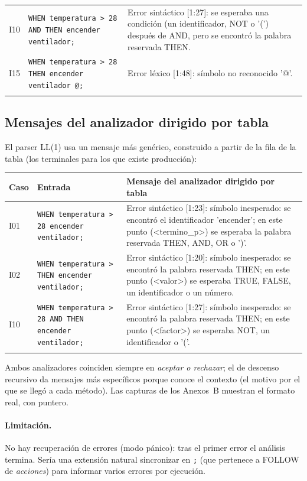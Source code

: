 \begin{longtable}{@{}l >{\raggedright\arraybackslash}p{5.2cm} >{\raggedright\arraybackslash}p{8.4cm}@{}}
\addlinespace[2pt]
I10 & \footnotesize \texttt{WHEN temperatura > 28 AND THEN encender ventilador;} & \footnotesize Error sintáctico [1:27]: se esperaba una condición (un identificador, NOT o '(') después de AND, pero se encontró la palabra reservada THEN. \\
\addlinespace[2pt]
I15 & \footnotesize \texttt{WHEN temperatura > 28 THEN encender ventilador @;} & \footnotesize Error léxico [1:48]: símbolo no reconocido '@'. \\
\addlinespace[2pt]
\bottomrule
\end{longtable}

\subsection{Mensajes del analizador dirigido por tabla}
El parser LL(1) usa un mensaje más genérico, construido a partir de la fila de la tabla (los terminales para los que existe producción):

\begin{longtable}{@{}l >{\raggedright\arraybackslash}p{4.4cm} >{\raggedright\arraybackslash}p{9.2cm}@{}}
\toprule
\textbf{Caso} & \textbf{Entrada} & \textbf{Mensaje del analizador dirigido por tabla} \\
\midrule
\endhead
I01 & \footnotesize \texttt{WHEN temperatura > 28 encender ventilador;} & \footnotesize Error sintáctico [1:23]: símbolo inesperado: se encontró el identificador 'encender'; en este punto (<termino\_p>) se esperaba la palabra reservada THEN, AND, OR o ')'. \\
\addlinespace[2pt]
I02 & \footnotesize \texttt{WHEN temperatura > THEN encender ventilador;} & \footnotesize Error sintáctico [1:20]: símbolo inesperado: se encontró la palabra reservada THEN; en este punto (<valor>) se esperaba TRUE, FALSE, un identificador o un número. \\
\addlinespace[2pt]
I10 & \footnotesize \texttt{WHEN temperatura > 28 AND THEN encender ventilador;} & \footnotesize Error sintáctico [1:27]: símbolo inesperado: se encontró la palabra reservada THEN; en este punto (<factor>) se esperaba NOT, un identificador o '('. \\
\addlinespace[2pt]
\bottomrule
\end{longtable}

Ambos analizadores coinciden siempre en \emph{aceptar o rechazar}; el de descenso recursivo da mensajes más específicos porque conoce el contexto
(el motivo por el que se llegó a cada método). Las capturas de los Anexos~B muestran el formato real, con puntero.

\paragraph{Limitación.} No hay recuperación de errores (modo pánico): tras el primer error el análisis termina. Sería una extensión natural
sincronizar en \texttt{;} (que pertenece a FOLLOW de \textit{acciones}) para informar varios errores por ejecución.

